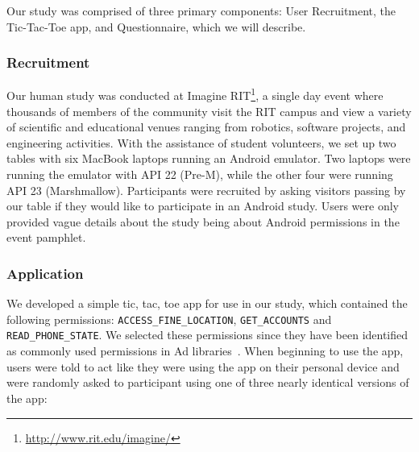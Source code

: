 \documentclass{sig-alternate-05-2015}
\begin{document}
Our study was comprised of three primary components: User Recruitment, the Tic-Tac-Toe app, and Questionnaire, which we will describe.

\subsubsection{Recruitment}

Our human study was conducted at Imagine RIT\footnote{\url{http://www.rit.edu/imagine/}}, a single day event where thousands of members of the community visit the RIT campus and view a variety of scientific and educational venues ranging from robotics, software projects, and engineering activities. With the assistance of student volunteers, we set up two tables with six MacBook laptops running an Android emulator. Two laptops were running the emulator with API 22 (Pre-M), while the other four were running API 23 (Marshmallow). Participants were recruited by asking visitors passing by our table if they would like to participate in an Android study. Users were only provided vague details about the study being about Android permissions in the event pamphlet.

\subsubsection{Application}

We developed a simple tic, tac, toe app for use in our study, which contained the following permissions: \texttt{ACCESS\_FINE\_LOCATION}, \texttt{GET\_ACCOUNTS} and \texttt{READ\_PHONE\_STATE}. We selected these permissions since they have been identified as commonly used permissions in Ad libraries~\cite{liu2015efficient}.  When beginning to use the app, users were told to act like they were using the app on their personal device and were randomly asked to participant using one of three nearly identical versions of the app:
\end{document}
